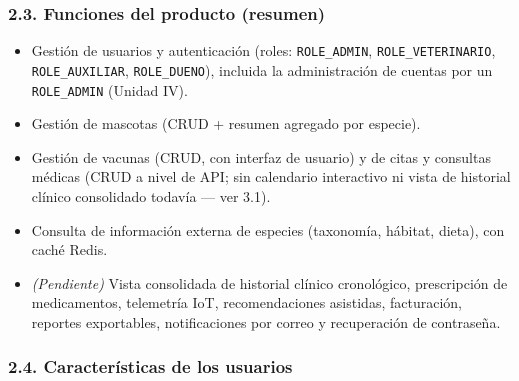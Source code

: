\documentclass[
  spanish,
]{article}
\providecommand{\tightlist}{%
  \setlength{\itemsep}{0pt}\setlength{\parskip}{0pt}}
\begin{document}
\subsubsection{2.3. Funciones del producto
(resumen)}\label{funciones-del-producto-resumen}

\begin{itemize}
\tightlist
\item
  Gestión de usuarios y autenticación (roles: \texttt{ROLE\_\allowbreak{}ADMIN},
  \texttt{ROLE\_\allowbreak{}VETERINARIO}, \texttt{ROLE\_\allowbreak{}AUXILIAR},
  \texttt{ROLE\_\allowbreak{}DUENO}), incluida la administración de cuentas por un
  \texttt{ROLE\_\allowbreak{}ADMIN} (Unidad IV).
\item
  Gestión de mascotas (CRUD + resumen agregado por especie).
\item
  Gestión de vacunas (CRUD, con interfaz de usuario) y de citas y
  consultas médicas (CRUD a nivel de API; sin calendario interactivo ni
  vista de historial clínico consolidado todavía --- ver 3.1).
\item
  Consulta de información externa de especies (taxonomía, hábitat,
  dieta), con caché Redis.
\item
  \emph{(Pendiente)} Vista consolidada de historial clínico cronológico,
  prescripción de medicamentos, telemetría IoT, recomendaciones
  asistidas, facturación, reportes exportables, notificaciones por
  correo y recuperación de contraseña.
\end{itemize}

\subsubsection{2.4. Características de los
usuarios}\label{caracteruxedsticas-de-los-usuarios}
\end{document}
